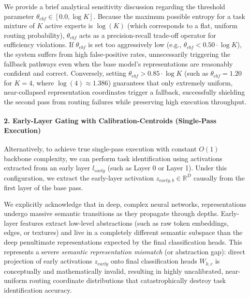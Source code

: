 We provide a brief analytical sensitivity discussion regarding the threshold parameter $\theta_{ebf} \in [0.0, \log K]$. Because the maximum possible entropy for a task mixture of $K$ active experts is $\log(K)$ (which corresponds to a flat, uniform routing probability), $\theta_{ebf}$ acts as a precision-recall trade-off operator for sufficiency violations. If $\theta_{ebf}$ is set too aggressively low (e.g., $\theta_{ebf} < 0.50 \cdot \log K$), the system suffers from high false-positive rates, unnecessarily triggering the fallback pathways even when the base model's representations are reasonably confident and correct. Conversely, setting $\theta_{ebf} > 0.85 \cdot \log K$ (such as $\theta_{ebf} = 1.20$ for $K=4$, where $\log(4) \approx 1.386$) guarantees that only extremely uniform, near-collapsed representation coordinates trigger a fallback, successfully shielding the second pass from routing failures while preserving high execution throughput.

\paragraph{2. Early-Layer Gating with Calibration-Centroids (Single-Pass Execution)}
Alternatively, to achieve true single-pass execution with constant $O(1)$ backbone complexity, we can perform task identification using activations extracted from an early layer $l_{early}$ (such as Layer 0 or Layer 1). Under this configuration, we extract the early-layer activation $z_{early, b} \in \mathbb{R}^D$ causally from the first layer of the base pass.

We explicitly acknowledge that in deep, complex neural networks, representations undergo massive semantic transitions as they propagate through depths. Early-layer features extract low-level abstractions (such as raw token embeddings, edges, or textures) and live in a completely different semantic subspace than the deep penultimate representations expected by the final classification heads. This represents a severe \emph{semantic representation mismatch} (or abstraction gap): direct projection of early activations $z_{early}$ onto final classification heads $W_{k, c}$ is conceptually and mathematically invalid, resulting in highly uncalibrated, near-uniform routing coordinate distributions that catastrophically destroy task identification accuracy.

